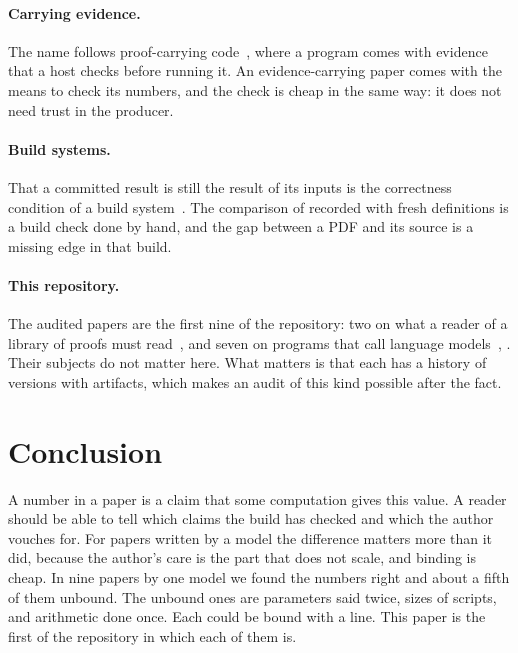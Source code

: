 \documentclass[acmsmall,nonacm,screen]{acmart}
\begin{document}
\paragraph{Carrying evidence.} The name follows proof-carrying code~\citep{necula1997},
where a program comes with evidence that a host checks before running it. An
evidence-carrying paper comes with the means to check its numbers, and the check is cheap in
the same way: it does not need trust in the producer.

\paragraph{Build systems.} That a committed result is still the result of its inputs is the
correctness condition of a build system~\citep{mokhov2018}. The comparison of recorded with
fresh definitions is a build check done by hand, and the gap between a PDF and its source is
a missing edge in that build.

\paragraph{This repository.} The audited papers are the first nine of the repository: two on
what a reader of a library of proofs must read~\citep{tpp1,tpp2}, and seven on programs that
call language models~\citep{tpp3,tpp4,tpp5,tpp6}, \citep{tpp7,tpp8,tpp9}. Their subjects do
not matter here. What matters is that each has a history of versions with artifacts, which makes an
audit of this kind possible after the fact.

\section{Conclusion}

A number in a paper is a claim that some computation gives this value. A reader should be
able to tell which claims the build has checked and which the author vouches for. For papers
written by a model the difference matters more than it did, because the author's care is the
part that does not scale, and binding is cheap. In nine papers by one model we found the
numbers right and about a fifth of them unbound. The unbound ones are parameters said
twice, sizes of scripts, and arithmetic done once. Each could be bound with a line. This
paper is the first of the repository in which each of them is.



\end{document}
